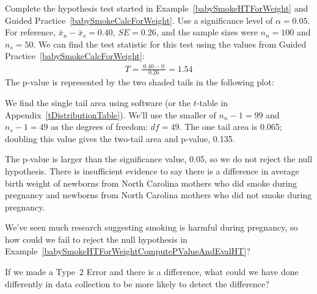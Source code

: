 \begin{examplewrap}
\begin{nexample}{Complete the
    hypothesis test started in
    Example~\ref{babySmokeHTForWeight}
    and Guided Practice~\ref{babySmokeCalcForWeight}.
    Use a significance level of $\alpha=0.05$.
    For reference, $\bar{x}_{n} - \bar{x}_{s} = 0.40$,
    $SE = 0.26$, and the sample sizes were $n_n = 100$
    and $n_s = 50$.}
  \label{babySmokeHTForWeightComputePValueAndEvalHT}%
  We can find the test statistic for this test
  using the values from
  Guided Practice~\ref{babySmokeCalcForWeight}:
  \begin{align*}
  T = \frac{\ 0.40 - 0\ }{0.26} = 1.54
  \end{align*}
  The p-value is represented by the two shaded tails
  in the following plot:
  \begin{center}
  \end{center}
  We find the single tail area using software
  (or the $t$-table in Appendix~\ref{tDistributionTable}).
  We'll use the
  smaller of $n_n - 1 = 99$ and $n_s - 1 = 49$ as the
  degrees of freedom: $df = 49$.
  The one tail area is 0.065;
  doubling this value gives the two-tail area and p-value,
  0.135.

  The p-value is larger than the significance value, 0.05,
  so we do not reject the null hypothesis.
  There is insufficient evidence to say there is a difference
  in average birth weight of newborns from North Carolina mothers
  who did smoke during pregnancy and newborns from North Carolina
  mothers who did not smoke during pregnancy.
\end{nexample}
\end{examplewrap}


\begin{exercisewrap}
\begin{nexercise}
We've seen much research suggesting smoking is harmful
during pregnancy, so how could we fail to reject the null
hypothesis in
Example~\ref{babySmokeHTForWeightComputePValueAndEvalHT}?
\footnotemark{}
\end{nexercise}
\end{exercisewrap}

\begin{exercisewrap}
\begin{nexercise}
\label{babySmokeHTIDingHowToDetectDifferences}%
If we made a Type~2 Error and there is a difference,
what could we have done differently in data collection
to be more likely to detect the difference?\footnotemark{}
\end{nexercise}
\end{exercisewrap}

